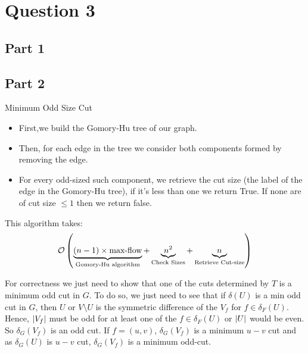 \documentclass[math, info]{cours}
\begin{document}
\section{Question 3}
\subsection{Part 1}


\subsection{Part 2}
\begin{algorithm}
	\caption{Minimum Odd Size Cut}
	\begin{itemize}
		\item First,we build the Gomory-Hu tree of our graph.
		\item Then, for each edge in the tree we consider both components formed by removing the edge.
		\item For every odd-sized such component, we retrieve the cut size (the label of the edge in the Gomory-Hu tree), if it's less than one we return True.
			If none are of cut size $\leq 1$ then we return false.
	\end{itemize}
\end{algorithm}

This algorithm takes:
\begin{equation*}
	\mathcal{O}\left( \underbrace{(n-1)\times \text{max-flow}}_{\text{Gomory-Hu algorithm}} + \underbrace{n^{2}}_{\text{Check Sizes}} + \underbrace{n}_{\text{Retrieve Cut-size}} \right)
\end{equation*}

For correctness we just need to show that one of the cuts determined by $T$ is a minimum odd cut in $G$.
To do so, we just need to see that if $\delta(U)$ is a min odd cut in $G$, then $U$ or $V \setminus U$ is the symmetric difference of the $V_{f}$ for $f \in \delta_{F}(U)$.
Hence, $\left|V_{f}\right|$ must be odd for at least one of the $f\in \delta_{F}(U)$ or $\left|U\right|$ would be even. So $\delta_{G}(V_{f})$ is an odd cut.
If $f = (u, v)$, $\delta_{G}(V_{f})$ is a minimum $u - v$ cut and as $\delta_{G}(U)$ is $u-v$ cut, $\delta_{G}(V_{f})$ is a minimum odd-cut.
\end{document}
